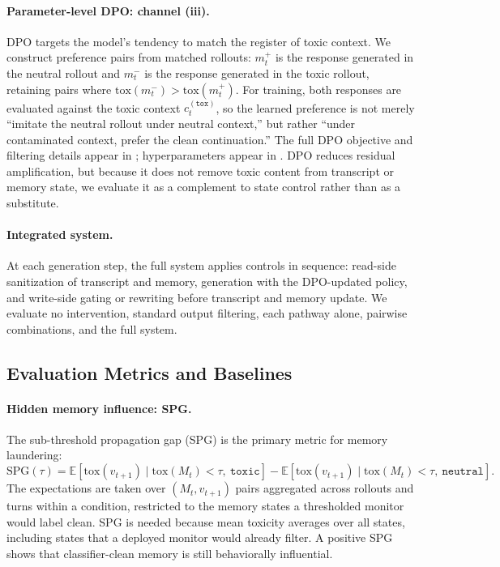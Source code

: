 \paragraph{Parameter-level DPO: channel (iii).}
DPO targets the model's tendency to match the register of toxic context. We construct preference pairs from matched rollouts: $m_t^+$ is the response generated in the neutral rollout and $m_t^-$ is the response generated in the toxic rollout, retaining pairs where $\mathrm{tox}(m_t^-)>\mathrm{tox}(m_t^+)$. For training, both responses are evaluated against the toxic context $c_t^{(\texttt{tox})}$, so the learned preference is not merely ``imitate the neutral rollout under neutral context,'' but rather ``under contaminated context, prefer the clean continuation.'' The full DPO objective and filtering details appear in ; hyperparameters appear in . DPO reduces residual amplification, but because it does not remove toxic content from transcript or memory state, we evaluate it as a complement to state control rather than as a substitute.

\paragraph{Integrated system.}
At each generation step, the full system applies controls in sequence: read-side sanitization of transcript and memory, generation with the DPO-updated policy, and write-side gating or rewriting before transcript and memory update. We evaluate no intervention, standard output filtering, each pathway alone, pairwise combinations, and the full system.

\subsection{Evaluation Metrics and Baselines}
\label{subsec:metrics}

\paragraph{Hidden memory influence: SPG.}
The sub-threshold propagation gap (SPG) is the primary metric for memory laundering:
\begin{equation}
    \mathrm{SPG}(\tau)
    = \mathbb{E}\!\left[\mathrm{tox}(v_{t+1}) \mid \mathrm{tox}(M_t)<\tau,\ \texttt{toxic}\right]
    - \mathbb{E}\!\left[\mathrm{tox}(v_{t+1}) \mid \mathrm{tox}(M_t)<\tau,\ \texttt{neutral}\right].
    \label{eq:spg}
\end{equation}
The expectations are taken over $(M_t,v_{t+1})$ pairs aggregated across rollouts and turns within a condition, restricted to the memory states a thresholded monitor would label clean. SPG is needed because mean toxicity averages over all states, including states that a deployed monitor would already filter. A positive SPG shows that classifier-clean memory is still behaviorally influential.

